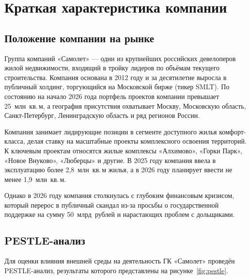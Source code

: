 \documentclass[12pt,a4paper]{article}
\begin{document}
\section{Краткая характеристика компании}

\subsection{Положение компании на рынке}

Группа компаний «Самолет» --- один из крупнейших российских девелоперов жилой недвижимости, входящий в тройку лидеров по объёмам текущего строительства. Компания основана в 2012 году и за десятилетие выросла в публичный холдинг, торгующийся на Московской бирже (тикер SMLT). По состоянию на начало 2026 года портфель проектов компании превышает 25~млн~кв.\,м, а география присутствия охватывает Москву, Московскую область, Санкт-Петербург, Ленинградскую область и ряд регионов России.

Компания занимает лидирующие позиции в сегменте доступного жилья комфорт-класса, делая ставку на масштабные проекты комплексного освоения территорий. К ключевым проектам относятся жилые комплексы «Алхимово», «Горки Парк», «Новое Внуково», «Люберцы» и другие. В 2025 году компания ввела в эксплуатацию более 2,8~млн~кв.\,м жилья, а в 2026 году планирует ввести не менее 1,9~млн~кв.\,м.

Однако в 2026 году компания столкнулась с глубоким финансовым кризисом, который перерос в публичный скандал из-за просьбы о государственной поддержке на сумму 50~млрд~рублей и нарастающих проблем с дольщиками.

\subsection{PESTLE-анализ}

Для оценки влияния внешней среды на деятельность ГК «Самолет» проведён PESTLE-анализ, результаты которого представлены на рисунке~\ref{fig:pestle}.
\end{document}
